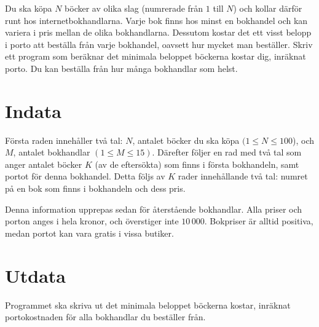Du ska köpa $N$ böcker av olika slag (numrerade från $1$ till $N$) och kollar därför runt hos internetbokhandlarna.
Varje bok finns hos minst en bokhandel och kan variera i pris mellan de olika bokhandlarna.
Dessutom kostar det ett visst belopp i porto att beställa från varje bokhandel, oavsett hur mycket man beställer.
Skriv ett program som beräknar det minimala beloppet böckerna kostar dig, inräknat porto.
Du kan beställa från hur många bokhandlar som helst.

\section*{Indata}
Första raden innehåller två tal: $N$, antalet böcker du ska köpa $(1 \le N \le 100$), och $M$, antalet bokhandlar $(1 \le M \le 15)$.
Därefter följer en rad med två tal som anger antalet böcker $K$ (av de eftersökta) som finns i första bokhandeln, samt portot för denna bokhandel.
Detta följs av $K$ rader innehållande två tal: numret på en bok som finns i bokhandeln och dess pris.

Denna information upprepas sedan för återstående bokhandlar.
Alla priser och porton anges i hela kronor, och överstiger inte $10\,000$.
Bokpriser är alltid positiva, medan portot kan vara gratis i vissa butiker.

\section*{Utdata}
Programmet ska skriva ut det minimala beloppet böckerna kostar, inräknat portokostnaden för alla bokhandlar du beställer från.
